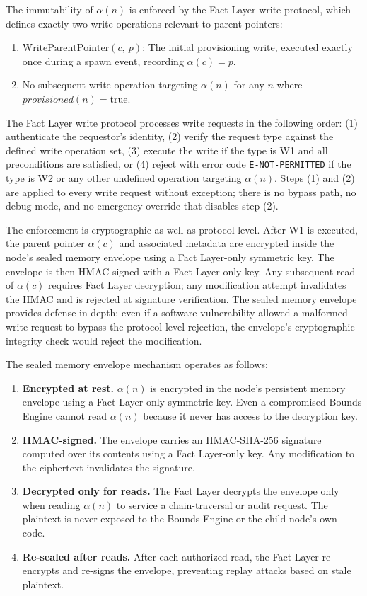 The immutability of $\alpha(n)$ is enforced by the Fact Layer write protocol, which defines exactly two write operations relevant to parent pointers:

\begin{enumerate}
    \item[\textbf{W1}] $\mathrm{WriteParentPointer}(c,\ p)$: The initial provisioning write, executed exactly once during a spawn event, recording $\alpha(c) = p$.
    \item[\textbf{W2}] No subsequent write operation targeting $\alpha(n)$ for any $n$ where $\textit{provisioned}(n) = \text{true}$.
\end{enumerate}

The Fact Layer write protocol processes write requests in the following order: (1) authenticate the requestor's identity, (2) verify the request type against the defined write operation set, (3) execute the write if the type is W1 and all preconditions are satisfied, or (4) reject with error code \texttt{E-NOT-PERMITTED} if the type is W2 or any other undefined operation targeting $\alpha(n)$. Steps (1) and (2) are applied to every write request without exception; there is no bypass path, no debug mode, and no emergency override that disables step (2).

The enforcement is cryptographic as well as protocol-level. After W1 is executed, the parent pointer $\alpha(c)$ and associated metadata are encrypted inside the node's sealed memory envelope using a Fact Layer-only symmetric key. The envelope is then HMAC-signed with a Fact Layer-only key. Any subsequent read of $\alpha(c)$ requires Fact Layer decryption; any modification attempt invalidates the HMAC and is rejected at signature verification. The sealed memory envelope provides defense-in-depth: even if a software vulnerability allowed a malformed write request to bypass the protocol-level rejection, the envelope's cryptographic integrity check would reject the modification.

The sealed memory envelope mechanism operates as follows:

\begin{enumerate}
    \item \textbf{Encrypted at rest.} $\alpha(n)$ is encrypted in the node's persistent memory envelope using a Fact Layer-only symmetric key. Even a compromised Bounds Engine cannot read $\alpha(n)$ because it never has access to the decryption key.
    \item \textbf{HMAC-signed.} The envelope carries an HMAC-SHA-256 signature computed over its contents using a Fact Layer-only key. Any modification to the ciphertext invalidates the signature.
    \item \textbf{Decrypted only for reads.} The Fact Layer decrypts the envelope only when reading $\alpha(n)$ to service a chain-traversal or audit request. The plaintext is never exposed to the Bounds Engine or the child node's own code.
    \item \textbf{Re-sealed after reads.} After each authorized read, the Fact Layer re-encrypts and re-signs the envelope, preventing replay attacks based on stale plaintext.
\end{enumerate}

